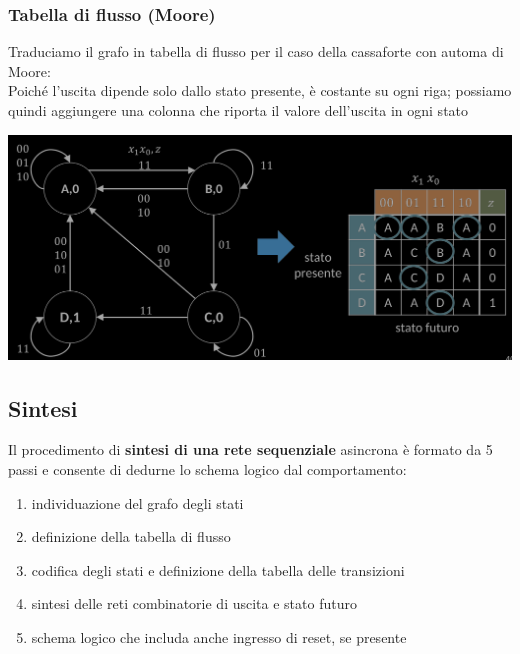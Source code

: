 \documentclass{article}
\begin{document}
\subsubsection{Tabella di flusso (Moore)}
Traduciamo il grafo in tabella di flusso per il caso della cassaforte con automa di Moore:
\vspace{0.1cm}\\
Poiché l’uscita dipende solo dallo stato presente, è costante su ogni riga; possiamo quindi aggiungere una colonna che riporta il valore dell'uscita in ogni stato
\begin{center}
    \includegraphics[scale=0.55]{TDFMoore.png}
\end{center}
\subsection{Sintesi}
Il procedimento di \textbf{\color{blue} sintesi di una rete sequenziale} asincrona è formato da 5 passi e consente di dedurne lo schema logico dal comportamento:
\begin{enumerate}
    \item individuazione del grafo degli stati
    \item definizione della tabella di flusso
    \item codifica degli stati e definizione della tabella delle transizioni
    \item sintesi delle reti combinatorie di uscita e stato futuro
    \item schema logico che includa anche ingresso di reset, se presente
\end{enumerate}
\end{document}
